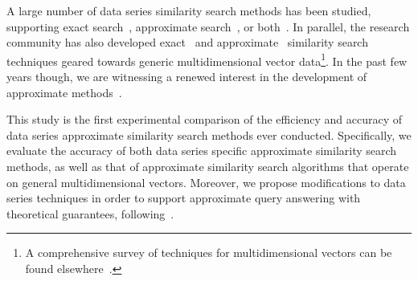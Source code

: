 A large number of data series similarity search methods has been studied, supporting exact search~\cite{conf/fodo/Agrawal1993,conf/kdd/shieh1998,conf/icde/Rafiei99,conf/kdd/Karras2011,conf/kdd/Mueen2012,code/Mueen2017}, approximate search~\cite{conf/icde/shatkay1996,conf/kdd/Keogh1997,conf/ssdm/Wang2000,conf/kdd/ColeSZ05,journal/vldb/Dallachiesa2014}, or both~\cite{conf/icdm/Camerra2010,journal/edbt/Schafer2012,conf/vldb/Wang2013,journal/kais/Camerra2014,journal/vldb/Zoumpatianos2016,dpisax,journal/pvldb/kondylakis18,ulisse,journal/vldb/linardi19,conf/bigdata/peng18,dpisaxjournal,coconutjournal,conf/icde/peng20}. 
In parallel, the research community has also developed exact~\cite{journal/cacm/bentley1975,conf/sigmod/Guttman1984,conf/icmd/Beckmann1990,conf/vldb/bertchold1996, conf/vldb/Ciaccia1997,conf/vldb/Weber1998,conf/cikm/Hakan2000} and approximate~\cite{conf/stoc/indyk1998} similarity search techniques geared towards generic multidimensional vector data\footnote{A comprehensive survey of techniques for multidimensional vectors can be found elsewhere~\cite{book/multiD/samet2005}.}. 
In the past few years though, we are witnessing a renewed interest in the development of approximate methods~\cite{journal/tpami/jegou2011,journal/iccv/xia2013,conf/vldb/sun14,journal/pami/babenko15,journal/corr/malkov16}. 

This study is the first experimental comparison of the efficiency and accuracy of data series approximate similarity search methods ever conducted. Specifically, we evaluate the accuracy of both data series specific approximate similarity search methods, as well as that of approximate similarity search algorithms that operate on general multidimensional vectors. 
Moreover, we propose modifications to data series techniques in order to support approximate query answering with theoretical guarantees, following~\cite{conf/icde/Ciaccia2000}. 

